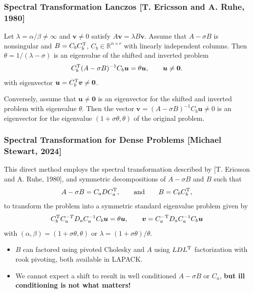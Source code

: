 \documentclass[landscape]{beamer}
\newcommand{\eqand}{\qquad\mbox{and}\qquad}
\renewcommand{\vec}[1]{\bm{#1}}
\newcommand{\T}{{\rm T}}
\begin{document}
\begin{frame}
  \frametitle{Spectral Transformation Lanczos
    [T. Ericsson and A. Ruhe, 1980]}

  \begin{lemma}
    \label{lm:spectral_transformation}
    Let $\lambda = \alpha/\beta \neq \infty$ and $\vec{v}\neq 0$ satisfy
    $A\vec{v} = \lambda B \vec{v}$.  Assume that $A-\sigma B$ is nonsingular and
    $B = C_b C_b^\T$, $C_b \in \mathbb{R}^{n \times r}$ with linearly independent
    columns.  Then $\theta = 1/(\lambda-\sigma)$ is an eigenvalue of
    the shifted and inverted problem
    \begin{equation*}
      C_b^\T (A-\sigma B)^{-1} C_b \vec{u} = \theta \vec{u}, \qquad \vec{u}\neq \vec{0}.
    \end{equation*}
    with eigenvector $\vec{u} = C_b^\T \vec{v}\neq \vec{0}$.

    Conversely, assume that $\vec{u}\neq \vec{0}$ is an eigenvector
    for the shifted and inverted problem with eigenvalue $\theta$.
    Then the vector $\vec{v} = (A - \sigma B)^{-1} C_b \vec{u}\neq 0$
    is an eigenvector for the eigenvalue $(1 + \sigma \theta, \theta)$
    of the original problem.
  \end{lemma}
\end{frame}

\begin{frame}
  \frametitle{Spectral Transformation for Dense Problems [Michael Stewart,
    2024]}
	This direct method employs the spectral transformation described by [T. Ericsson and A. Ruhe, 1980], and symmetric decompositions of $A- \sigma B$ and $B$ such that
	\begin{equation*}
		A-\sigma B = C_a D C_a^\T, \eqand B = C_b C_b^\T,
	\end{equation*} 
	to transform the problem into a symmetric standard eigenvalue problem given by
	\begin{equation*}
		C_b^\T C_a^{-T} D_a C_a^{-1} C_b \vec{u} = \theta \vec{u},\qquad 
		\vec{v} = C_a^{-\T} D_a C_a^{-1} C_b \vec{u}
	\end{equation*}
	with $(\alpha, \beta) = (1+\sigma \theta, \theta)$ or $\lambda = (1+\sigma\theta)/\theta$.
	
	\begin{itemize}
		\item $B$ can factored using pivoted Cholesky and $A$ using $LDL^\T$
		factorization with rook pivoting, both available in LAPACK.
		\item We cannot expect a shift to result in well conditioned
		$A-\sigma B$ or $C_a$,  {\bf but ill conditioning is not what matters!}
	\end{itemize}
\end{frame}
\end{document}
